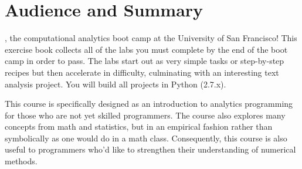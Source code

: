 \chapter{Audience and Summary}

, the computational analytics boot camp at the University of San Francisco! This exercise book collects all of the labs you must complete by the end of the boot camp in order to pass.  The labs start out as very simple tasks or step-by-step recipes but then accelerate in difficulty, culminating with an interesting text analysis project. You will build all projects in Python (2.7.x).


This course is specifically designed as an introduction to analytics programming for those who are not yet skilled programmers. The course also explores many concepts from math and statistics, but in an empirical fashion rather than symbolically as one would do in a math class. Consequently, this course is also useful to programmers who'd like to strengthen their understanding of numerical methods.

